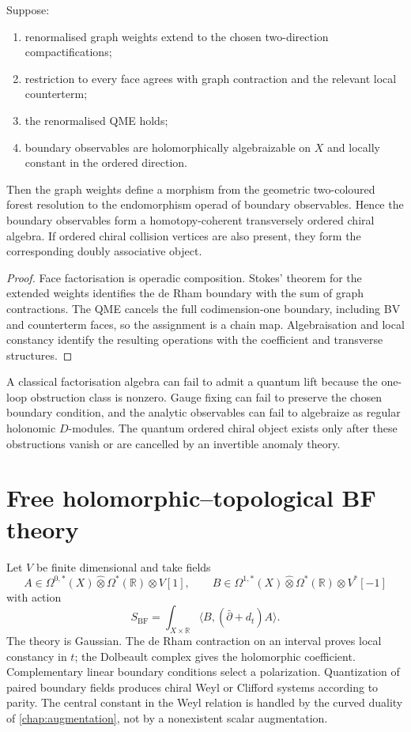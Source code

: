 \begin{theorem}\label{thm:feynman-weight}
Suppose:
\begin{enumerate}
\item renormalised graph weights extend to the chosen two-direction compactifications;
\item restriction to every face agrees with graph contraction and the relevant local counterterm;
\item the renormalised QME holds;
\item boundary observables are holomorphically algebraizable on \(X\) and locally constant in the ordered direction.
\end{enumerate}
Then the graph weights define a morphism from the geometric two-coloured forest resolution to the endomorphism operad of boundary observables.  Hence the boundary observables form a homotopy-coherent transversely ordered chiral algebra.  If ordered chiral collision vertices are also present, they form the corresponding doubly associative object.
\end{theorem}
\begin{proof}
Face factorisation is operadic composition.  Stokes' theorem for the extended weights identifies the de Rham boundary with the sum of graph contractions.  The QME cancels the full codimension-one boundary, including BV and counterterm faces, so the assignment is a chain map.  Algebraisation and local constancy identify the resulting operations with the coefficient and transverse structures.
\end{proof}

\begin{nogobox}[title={No-go theorem 19: a classical local model does not automatically quantize}]
A classical factorisation algebra can fail to admit a quantum lift because the one-loop obstruction class is nonzero.  Gauge fixing can fail to preserve the chosen boundary condition, and the analytic observables can fail to algebraize as regular holonomic \(D\)-modules.  The quantum ordered chiral object exists only after these obstructions vanish or are cancelled by an invertible anomaly theory.
\end{nogobox}

\section{Free holomorphic--topological BF theory}
Let \(V\) be finite dimensional and take fields
\[
 A\in\Omega^{0,*}(X)\widehat\otimes\Omega^*(\mathbb R)\otimes V[1],
 \qquad
 B\in\Omega^{1,*}(X)\widehat\otimes\Omega^*(\mathbb R)\otimes V^*[-1]
\]
with action
\[
 S_{\mathrm{BF}}=\int_{X\times\mathbb R}
 \langle B,(\bar\partial+d_t)A\rangle.
\]
The theory is Gaussian.  The de Rham contraction on an interval proves local constancy in \(t\); the Dolbeault complex gives the holomorphic coefficient.  Complementary linear boundary conditions select a polarization.  Quantization of paired boundary fields produces chiral Weyl or Clifford systems according to parity.  The central constant in the Weyl relation is handled by the curved duality of \cref{chap:augmentation}, not by a nonexistent scalar augmentation.

